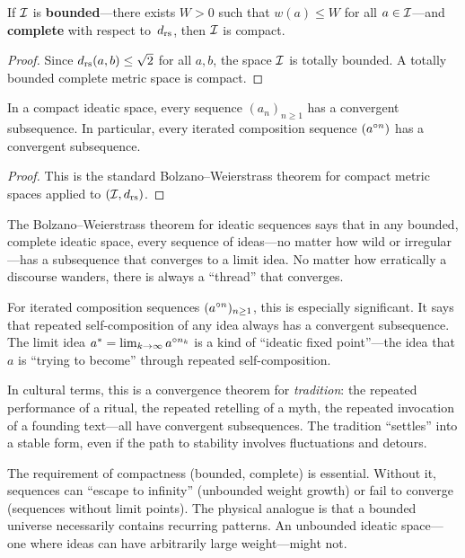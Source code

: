 \begin{theorem}
\label{thm:compact}
If $\mathcal{I}$ is \textbf{bounded}---there exists $W > 0$ such that
$w(a) \le W$ for all $a \in \mathcal{I}$---and \textbf{complete} with
respect to~$d_{\mathrm{rs}}$, then $\mathcal{I}$ is compact.
\end{theorem}

\begin{proof}
Since $d_{\mathrm{rs}}(a,b) \le \sqrt{2}$ for all $a,b$, the space $\mathcal{I}$
is totally bounded.  A totally bounded complete metric space is
compact.
\end{proof}

\begin{theorem}
\label{thm:bolzano-weierstrass}
In a compact ideatic space, every sequence $(a_n)_{n \ge 1}$
has a convergent subsequence.  In particular, every iterated
composition sequence $(a^{\circ n})$ has a convergent
subsequence.
\end{theorem}

\begin{proof}
This is the standard Bolzano--Weierstrass theorem for compact
metric spaces applied to $(\mathcal{I}, d_{\mathrm{rs}})$.
\end{proof}

\begin{interpretation}
The Bolzano--Weierstrass theorem for ideatic sequences says that in
any bounded, complete ideatic space, every sequence of ideas---no matter
how wild or irregular---has a subsequence that converges to a limit idea.
No matter how erratically a discourse wanders, there is always a
``thread'' that converges.

For iterated composition sequences $(a^{\circ n})_{n \ge 1}$, this is
especially significant.  It says that repeated self-composition of any
idea always has a convergent subsequence.  The limit idea $a^* =
\lim_{k \to \infty} a^{\circ n_k}$ is a kind of ``ideatic fixed
point''---the idea that $a$ is ``trying to become'' through repeated
self-composition.

In cultural terms, this is a convergence theorem for \emph{tradition}:
the repeated performance of a ritual, the repeated retelling of a myth,
the repeated invocation of a founding text---all have convergent
subsequences.  The tradition ``settles'' into a stable form, even if
the path to stability involves fluctuations and detours.

The requirement of compactness (bounded, complete) is essential.
Without it, sequences can ``escape to infinity'' (unbounded weight growth)
or fail to converge (sequences without limit points).  The physical
analogue is that a bounded universe necessarily contains recurring
patterns.  An unbounded ideatic space---one where ideas can have
arbitrarily large weight---might not.
\end{interpretation}

